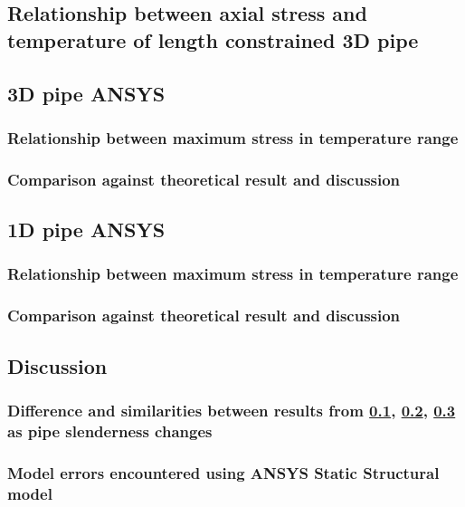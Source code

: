 \subsection{Relationship between axial stress and temperature of length constrained 3D pipe}\label{part1b}
\subsection{3D pipe ANSYS}\label{part1c}
\subsubsection{Relationship between maximum stress in temperature range}
\subsubsection{Comparison against theoretical result and discussion}
\subsection{1D pipe ANSYS}\label{part1d}
\subsubsection{Relationship between maximum stress in temperature range}
\subsubsection{Comparison against theoretical result and discussion}
\subsection{Discussion}
\subsubsection{Difference and similarities between results from \ref{part1b}, \ref{part1c}, \ref{part1d} as pipe slenderness changes}
\subsubsection{Model errors encountered using ANSYS Static Structural model}